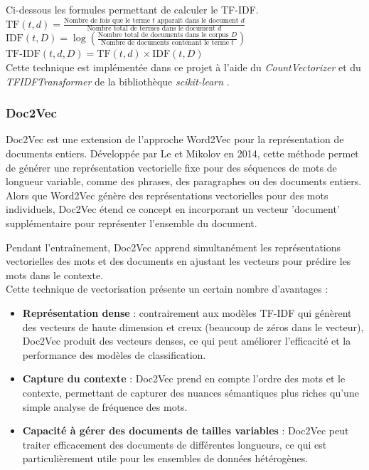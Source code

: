 \documentclass[a4paper,12pt]{article}
\begin{document}
Ci-dessous les formules permettant de calculer le TF-IDF.\\

$\text{TF}(t, d) = \frac{\text{Nombre de fois que le terme } t \text{ apparaît dans le document } d}{\text{Nombre total de termes dans le document } d}$\\

$\text{IDF}(t, D) = \log \left(\frac{\text{Nombre total de documents dans le corpus } D}{\text{Nombre de documents contenant le terme } t}\right)$\\

$\text{TF-IDF}(t, d, D) = \text{TF}(t, d) \times \text{IDF}(t, D)$\\

Cette technique est implémentée dans ce projet à l'aide du \textit{CountVectorizer} et du \textit{TFIDFTransformer} de la bibliothèque \textit{scikit-learn} \cite{tfidfsklearn}.


\subsubsection{Doc2Vec}

Doc2Vec est une extension de l'approche Word2Vec pour la représentation de documents entiers. Développée par Le et Mikolov en 2014, cette méthode permet de générer une représentation vectorielle fixe pour des séquences de mots de longueur variable, comme des phrases, des paragraphes ou des documents entiers.\\

Alors que Word2Vec génère des représentations vectorielles pour des mots individuels, Doc2Vec étend ce concept en incorporant un vecteur 'document' supplémentaire pour représenter l'ensemble du document.

Pendant l'entraînement, Doc2Vec apprend simultanément les représentations vectorielles des mots et des documents en ajustant les vecteurs pour prédire les mots dans le contexte.\\

Cette technique de vectorisation présente un certain nombre d'avantages : 
\begin{itemize}
    \item \textbf{Représentation dense} : contrairement aux modèles TF-IDF qui génèrent des vecteurs de haute dimension et creux (beaucoup de zéros dans le vecteur), Doc2Vec produit des vecteurs denses, ce qui peut améliorer l'efficacité et la performance des modèles de classification.
    \item \textbf{Capture du contexte} : Doc2Vec prend en compte l'ordre des mots et le contexte, permettant de capturer des nuances sémantiques plus riches qu'une simple analyse de fréquence des mots.
    \item \textbf{Capacité à gérer des documents de tailles variables} : Doc2Vec peut traiter efficacement des documents de différentes longueurs, ce qui est particulièrement utile pour les ensembles de données hétérogènes.
\end{itemize}
\end{document}
